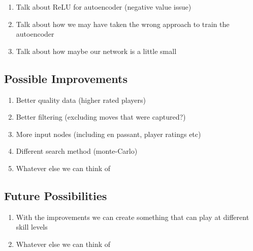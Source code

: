 \documentclass[12pt]{article}
\begin{document}
    \begin{enumerate}
        \item Talk about ReLU for autoencoder (negative value issue)
        \item Talk about how we may have taken the wrong approach to train the autoencoder
        \item Talk about how maybe our network is a little small 
    \end{enumerate}

    \subsection{Possible Improvements}

    \begin{enumerate}
        \item Better quality data (higher rated players)
        \item Better filtering (excluding moves that were captured?)
        \item More input nodes (including en passant, player ratings etc)
        \item Different search method (monte-Carlo)
        \item Whatever else we can think of
    \end{enumerate}

    \subsection{Future Possibilities}

    \begin{enumerate}
        \item With the improvements we can create something that can play at different skill levels 
        \item Whatever else we can think of
    \end{enumerate}
    
    \clearpage
    \printbibliography
\end{document}
